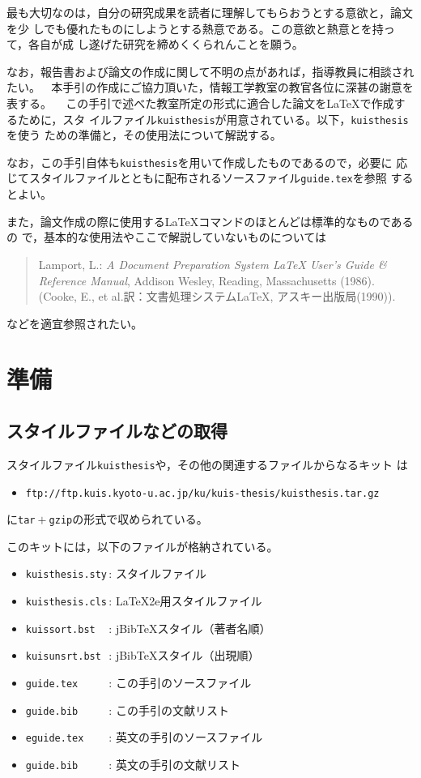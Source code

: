 \documentclass[master]{kuisthesis}		%
\def\LATEXe{\ifx\LaTeXe\undefined \LaTeX 2e\else\LaTeXe\fi}
\def\|{\verb|}
\begin{document}
最も大切なのは，自分の研究成果を読者に理解してもらおうとする意欲と，論文を少
しでも優れたものにしようとする熱意である。この意欲と熱意とを持って，各自が成
し遂げた研究を締めくくられんことを願う。

なお，報告書および論文の作成に関して不明の点があれば，指導教員に相談されたい。

\acknowledgments				% 謝辞
本手引の作成にご協力頂いた，情報工学教室の教官各位に深甚の謝意を表する。

\nocite{*}
			% 文献スタイルの指定
				% 参考文献の出力

						% 付録の開始
この手引で述べた教室所定の形式に適合した論文を\LaTeX で作成するために，スタ
イルファイル\|kuisthesis|が用意されている。以下，\|kuisthesis|を使う
ための準備と，その使用法について解説する。

なお，この手引自体も\|kuisthesis|を用いて作成したものであるので，必要に
応じてスタイルファイルとともに配布されるソースファイル\|guide.tex|を参照
するとよい。

また，論文作成の際に使用する\LaTeX コマンドのほとんどは標準的なものであるの
で，基本的な使用法やここで解説していないものについては
\begin{quote}%
Lamport, L.: {\em A Document Preparation System {\LaTeX} User's Guide \&
Reference Manual\/}, Addison Wesley, Reading, Massachusetts (1986).
(Cooke, E., et al.訳：文書処理システム{\LaTeX}, アスキー出版局(1990)).
\end{quote}%
などを適宜参照されたい。

\section{準備}\label{app-prelim}
\subsection{スタイルファイルなどの取得}\label{appsub-kit}
スタイルファイル\|kuisthesis|や，その他の関連するファイルからなるキット
は
\begin{itemize}\item[]\small%
\|ftp://ftp.kuis.kyoto-u.ac.jp/ku/kuis-thesis/kuisthesis.tar.gz|
\end{itemize}%
に\|tar|${}+{}$\|gzip|の形式で収められている。

このキットには，以下のファイルが格納されている。
\begin{itemize}%
\item
\|kuisthesis.sty|\,:
スタイルファイル
\item
\|kuisthesis.cls|\,:
{\LATEXe}用スタイルファイル
\item
\|kuissort.bst  |\,:
jBib\TeX スタイル（著者名順）
\item
\|kuisunsrt.bst |\,:
jBib\TeX スタイル（出現順）
\item
\|guide.tex     |\,:
この手引のソースファイル
\item
\|guide.bib     |\,:
この手引の文献リスト
\item
\|eguide.tex    |\,:
英文の手引のソースファイル
\item
\|guide.bib     |\,:
英文の手引の文献リスト
\end{itemize}%

\end{document}
